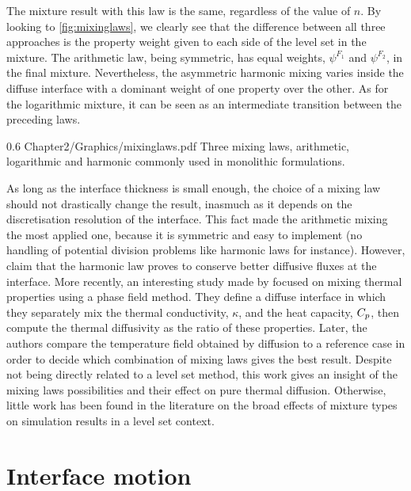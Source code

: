 The mixture result with this law is the same, regardless of the value of $n$.
By looking to \cref{fig:mixinglaws}, we clearly see that the difference between all three approaches is the property weight given to each side 
of the level set in the mixture. The arithmetic law, being symmetric, has equal weights, $\psi^{F_1}$ and $\psi^{F_2}$, in the final mixture. 
Nevertheless, the asymmetric harmonic mixing varies inside the diffuse interface with a dominant weight of one property 
over the other. As for the logarithmic mixture, it can be seen as an intermediate transition between the preceding laws.

\begin{figureth}
{0.6}
{Chapter2/Graphics/mixinglaws.pdf}
{Three mixing laws, arithmetic, logarithmic and harmonic commonly used in monolithic formulations.}
\label{fig:mixinglaws}
\end{figureth}

As long as the interface thickness is small enough, the choice of a mixing law should not drastically change the result, 
inasmuch as it depends on the discretisation resolution of the interface. This fact made the arithmetic mixing
the most applied one, because it is symmetric and easy to implement (no handling of potential division problems like harmonic laws for instance). 
However, \citet{strotos_numerical_2008} claim that the harmonic law proves to conserve better diffusive fluxes at the interface.
More recently, an interesting study made by \citet{ettrich_modelling_2014} focused on mixing thermal properties using a phase field method.
They define a diffuse interface in which they separately mix the thermal conductivity, $\kappa$, and the heat capacity, $C_p$,
then compute the thermal diffusivity as the ratio of these properties. Later, the authors compare the temperature field obtained by diffusion
to a reference case in order to decide which combination of mixing laws gives the best result. Despite not being directly related to a level set 
method, this work gives an insight of the mixing laws possibilities and their effect on pure thermal diffusion.
Otherwise, little work has been found in the literature on the broad effects of mixture types on simulation results in a level set context.


\section{Interface motion} %

